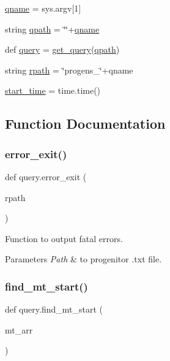 \begin{DoxyCompactItemize}
\item 
\hyperlink{namespacequery_ad85ee362e4d3c01fe2dfe01e693174c5}{qname} = sys.\+argv\mbox{[}1\mbox{]}
\item 
string \hyperlink{namespacequery_a46f3ad2dbb08867f79cc0b7699518b21}{qpath} = \char`\"{}\char`\"{}+\hyperlink{namespacequery_ad85ee362e4d3c01fe2dfe01e693174c5}{qname}
\item 
def \hyperlink{namespacequery_a7077167865224233566753fc78aadb36}{query} = \hyperlink{namespacequery_a5c2d384360f955a8d047fe01db312f88}{get\+\_\+query}(\hyperlink{namespacequery_a46f3ad2dbb08867f79cc0b7699518b21}{qpath})
\item 
string \hyperlink{namespacequery_a9391898f449326a0aae5c74a2f8f2da4}{rpath} = \char`\"{}progens\+\_\+\char`\"{}+qname
\item 
\hyperlink{namespacequery_a2530c3908f0179486a4c2255f792e27a}{start\+\_\+time} = time.\+time()
\end{DoxyCompactItemize}


\subsection{Function Documentation}
\mbox{\label{namespacequery_ab4cc339827af9c220b7b48313f8307e2}} 
\subsubsection{\texorpdfstring{error\+\_\+exit()}{error\_exit()}}
{\footnotesize\ttfamily def query.\+error\+\_\+exit (\begin{DoxyParamCaption}\item[{}]{rpath }\end{DoxyParamCaption})}



Function to output fatal errors. 


\begin{DoxyParams}{Parameters}
{\em Path} & to progenitor .txt file. \\
\hline
\end{DoxyParams}
\mbox{\label{namespacequery_af3cc8bfffa803d1a634868d08e9cedb7}} 
\subsubsection{\texorpdfstring{find\+\_\+mt\+\_\+start()}{find\_mt\_start()}}
{\footnotesize\ttfamily def query.\+find\+\_\+mt\+\_\+start (\begin{DoxyParamCaption}\item[{}]{mt\+\_\+arr }\end{DoxyParamCaption})}




